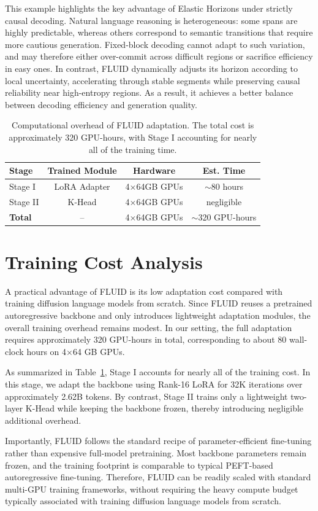 \documentclass[11pt]{article}
\begin{document}
This example highlights the key advantage of Elastic Horizons under strictly causal decoding. Natural language reasoning is heterogeneous: some spans are highly predictable, whereas others correspond to semantic transitions that require more cautious generation. Fixed-block decoding cannot adapt to such variation, and may therefore either over-commit across difficult regions or sacrifice efficiency in easy ones. In contrast, FLUID dynamically adjusts its horizon according to local uncertainty, accelerating through stable segments while preserving causal reliability near high-entropy regions. As a result, it achieves a better balance between decoding efficiency and generation quality.

\begin{table}[h]
\centering
\small
\setlength{\tabcolsep}{1pt}
\begin{tabular}{lccc}
\toprule
\textbf{Stage} & \textbf{Trained Module} & \textbf{Hardware} & \textbf{Est. Time} \\
\midrule
Stage I & LoRA Adapter & 4$\times$64GB GPUs & $\sim$80 hours \\
Stage II & K-Head & 4$\times$64GB GPUs & negligible \\
\midrule
\textbf{Total} & -- & 4$\times$64GB GPUs & $\sim$320 GPU-hours \\
\bottomrule
\end{tabular}
\caption{Computational overhead of FLUID adaptation. The total cost is approximately 320 GPU-hours, with Stage I accounting for nearly all of the training time.}
\label{tab:compute_cost}
\end{table}

\section{Training Cost Analysis}
A practical advantage of FLUID is its low adaptation cost compared with training diffusion language models from scratch. Since FLUID reuses a pretrained autoregressive backbone and only introduces lightweight adaptation modules, the overall training overhead remains modest. In our setting, the full adaptation requires approximately 320 GPU-hours in total, corresponding to about 80 wall-clock hours on 4$\times$64 GB GPUs.

As summarized in Table~\ref{tab:compute_cost}, Stage I accounts for nearly all of the training cost. In this stage, we adapt the backbone using Rank-16 LoRA for 32K iterations over approximately 2.62B tokens. By contrast, Stage II trains only a lightweight two-layer K-Head while keeping the backbone frozen, thereby introducing negligible additional overhead.

Importantly, FLUID follows the standard recipe of parameter-efficient fine-tuning rather than expensive full-model pretraining. Most backbone parameters remain frozen, and the training footprint is comparable to typical PEFT-based autoregressive fine-tuning. Therefore, FLUID can be readily scaled with standard multi-GPU training frameworks, without requiring the heavy compute budget typically associated with training diffusion language models from scratch.
\end{document}
